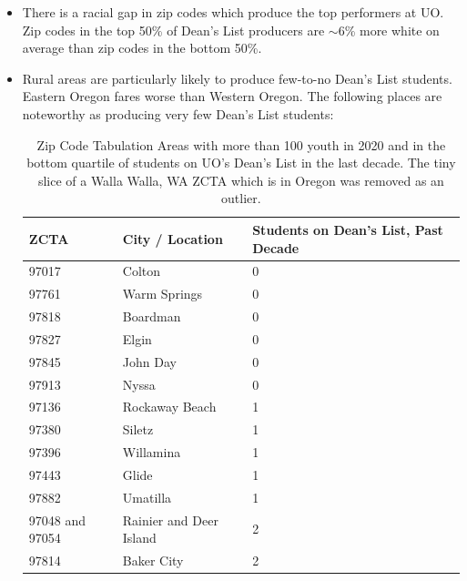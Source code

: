 \documentclass[10pt]{article}
\begin{document}
\begin{itemize}
	\item There is a racial gap in zip codes which produce the top performers at UO. Zip codes in the top 50\% of Dean's List producers are $\sim$6\% more white on average than zip codes in the bottom 50\%.
	\item Rural areas are particularly likely to produce few-to-no Dean's List students. Eastern Oregon fares worse than Western Oregon. The following places are noteworthy as producing very few Dean's List students:
	
	\begin{longtable}[c]{|l|l|l|}
		\caption{Zip Code Tabulation Areas with more than 100 youth in 2020 and in the bottom quartile of students on UO's Dean's List in the last decade. The tiny slice of a Walla Walla, WA ZCTA which is in Oregon was removed as an outlier.}
		\label{tab:areas-of-concern}\\
		\hline
		\textbf{ZCTA} & \textbf{City / Location}  & \textbf{Students on Dean's List, Past Decade} \\ \hline
		\endhead
		97017         & Colton         & 0                                             \\ \hline
		97761         & Warm Springs   & 0                                             \\ \hline
		97818         & Boardman       & 0                                             \\ \hline
		97827         & Elgin          & 0                                             \\ \hline
		97845         & John Day       & 0                                             \\ \hline
		97913         & Nyssa          & 0                                             \\ \hline
		97136         & Rockaway Beach & 1                                             \\ \hline
		97380         & Siletz         & 1                                             \\ \hline
		97396         & Willamina      & 1                                             \\ \hline
		97443         & Glide          & 1                                             \\ \hline
		97882         & Umatilla       & 1                                             \\ \hline
		97048 and 97054 & Rainier and Deer Island      & 2                                             \\ \hline
		97814         & Baker City     & 2                                             \\ \hline
	\end{longtable}
	

\end{itemize}
\end{document}

